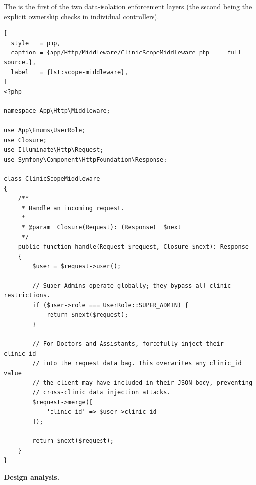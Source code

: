The  is the first of the two
data-isolation enforcement layers (the second being the explicit
ownership checks in individual controllers).

\begin{lstlisting}[
  style   = php,
  caption = {app/Http/Middleware/ClinicScopeMiddleware.php --- full source.},
  label   = {lst:scope-middleware},
]
<?php

namespace App\Http\Middleware;

use App\Enums\UserRole;
use Closure;
use Illuminate\Http\Request;
use Symfony\Component\HttpFoundation\Response;

class ClinicScopeMiddleware
{
    /**
     * Handle an incoming request.
     *
     * @param  Closure(Request): (Response)  $next
     */
    public function handle(Request $request, Closure $next): Response
    {
        $user = $request->user();

        // Super Admins operate globally; they bypass all clinic restrictions.
        if ($user->role === UserRole::SUPER_ADMIN) {
            return $next($request);
        }

        // For Doctors and Assistants, forcefully inject their clinic_id
        // into the request data bag. This overwrites any clinic_id value
        // the client may have included in their JSON body, preventing
        // cross-clinic data injection attacks.
        $request->merge([
            'clinic_id' => $user->clinic_id
        ]);

        return $next($request);
    }
}
\end{lstlisting}

\textbf{Design analysis.}

